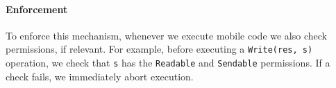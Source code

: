 \paragraph{Enforcement}
To enforce this mechanism, whenever we execute mobile code we also check permissions, if relevant. For example, before executing a \lstinline{Write(res, s)} operation, we check that \lstinline{s} has the \lstinline{Readable} and \lstinline{Sendable} permissions. If a check fails, we immediately abort execution.

